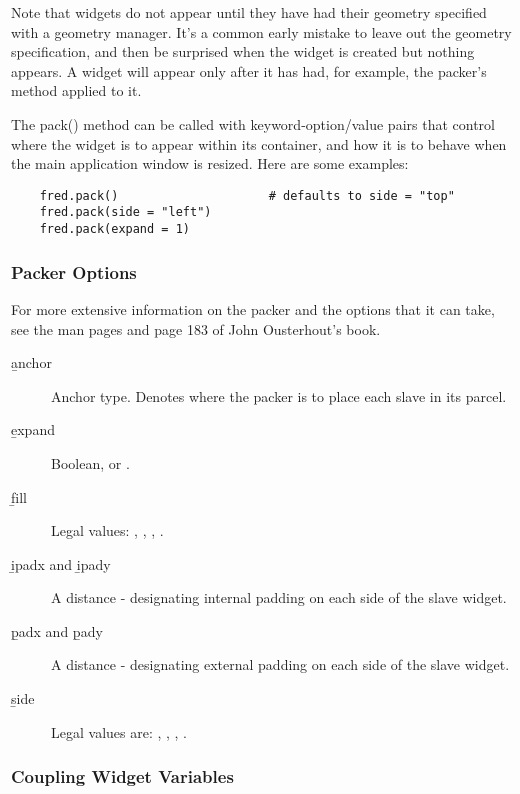 Note that widgets do not appear until they have had their geometry
specified with a geometry manager.  It's a common early mistake to
leave out the geometry specification, and then be surprised when the
widget is created but nothing appears.  A widget will appear only
after it has had, for example, the packer's  method
applied to it.

The pack() method can be called with keyword-option/value pairs that
control where the widget is to appear within its container, and how it
is to behave when the main application window is resized.  Here are
some examples:

\begin{verbatim}
    fred.pack()                     # defaults to side = "top"
    fred.pack(side = "left")
    fred.pack(expand = 1)
\end{verbatim}


\subsubsection{Packer Options}

For more extensive information on the packer and the options that it
can take, see the man pages and page 183 of John Ousterhout's book.

\begin{description}
\item[\b{anchor }]
Anchor type.  Denotes where the packer is to place each slave in its
parcel.

\item[\b{expand}]
Boolean,  or .

\item[\b{fill}]
Legal values: , , , .

\item[\b{ipadx} and \b{ipady}]
A distance - designating internal padding on each side of the slave
widget.

\item[\b{padx} and \b{pady}]
A distance - designating external padding on each side of the slave
widget.

\item[\b{side}]
Legal values are: , , ,
.
\end{description}


\subsubsection{Coupling Widget Variables} %

